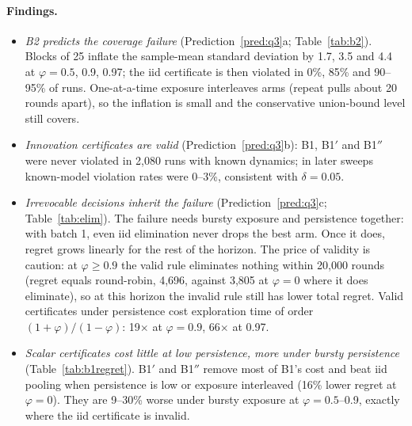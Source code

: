 \documentclass[11pt]{article}
\theoremstyle{definition}
\theoremstyle{remark}
\begin{document}
\begin{table}[t]\centering\small
{}
\caption{B2's decision consequence: certified successive elimination, 100 worlds per cell, $T=20{,}000$, known dynamics for the valid rule. An independent implementation finds 30/100 and 47/100 drops at $\varphi=0.97$ and $0.995$, against 0/100.}\label{tab:elim}
\end{table}

\paragraph{Findings.}
\begin{itemize}
\item \emph{B2 predicts the coverage failure} (Prediction~\ref{pred:q3}a; Table~\ref{tab:b2}). Blocks of 25 inflate the sample-mean standard deviation by 1.7, 3.5 and 4.4 at $\varphi=0.5$, 0.9, 0.97; the iid certificate is then violated in 0\%, 85\% and 90--95\% of runs. One-at-a-time exposure interleaves arms (repeat pulls about 20 rounds apart), so the inflation is small and the conservative union-bound level still covers.
\item \emph{Innovation certificates are valid} (Prediction~\ref{pred:q3}b): B1, B1$'$ and B1$''$ were never violated in 2,080 runs with known dynamics; in later sweeps known-model violation rates were 0--3\%, consistent with $\delta=0.05$.
\item \emph{Irrevocable decisions inherit the failure} (Prediction~\ref{pred:q3}c; Table~\ref{tab:elim}). The failure needs bursty exposure and persistence together: with batch 1, even iid elimination never drops the best arm. Once it does, regret grows linearly for the rest of the horizon. The price of validity is caution: at $\varphi\ge0.9$ the valid rule eliminates nothing within 20,000 rounds (regret equals round-robin, 4,696, against 3,805 at $\varphi=0$ where it does eliminate), so at this horizon the invalid rule still has lower total regret. Valid certificates under persistence cost exploration time of order $(1+\varphi)/(1-\varphi)$: 19$\times$ at $\varphi=0.9$, 66$\times$ at 0.97.
\item \emph{Scalar certificates cost little at low persistence, more under bursty persistence} (Table~\ref{tab:b1regret}). B1$'$ and B1$''$ remove most of B1's cost and beat iid pooling when persistence is low or exposure interleaved (16\% lower regret at $\varphi=0$). They are 9--30\% worse under bursty exposure at $\varphi=0.5$--0.9, exactly where the iid certificate is invalid.
\end{itemize}
\end{document}

